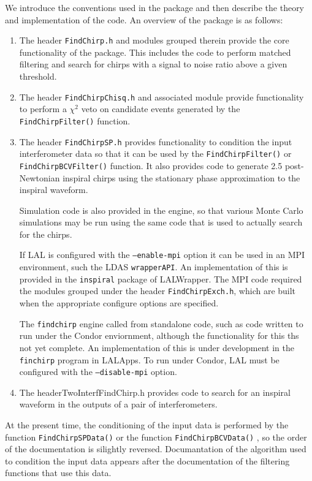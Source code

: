 We introduce the conventions used in the package and then describe the theory
and implementation of the code. An overview of the package is as follows:
\begin{enumerate}
\item The header \texttt{FindChirp.h} and modules grouped therein provide the
core functionality of the package. This includes the code to perform matched
filtering and search for chirps with a signal to noise ratio above a given
threshold.

\item The header \texttt{FindChirpChisq.h} and associated module provide
functionality to perform a $\chi^2$ veto on candidate events generated by the
\texttt{FindChirpFilter()} function.

\item The header \texttt{FindChirpSP.h} provides functionality to condition
the input interferometer data so that it can be used by the 
\texttt{FindChirpFilter()}
or \texttt{FindChirpBCVFilter()} function. 
It also provides code to generate 2.5
post-Newtonian inspiral chirps using the stationary phase approximation to the
inspiral waveform.

Simulation code is also provided in the engine, so that various Monte Carlo
simulations may be run using the same code that is used to actually search for
the chirps.

If LAL is configured with the \texttt{--enable-mpi} option it can
be used in an MPI environment, such the LDAS \texttt{wrapperAPI}. An
implementation of this is provided in the \texttt{inspiral} package of
LALWrapper. The MPI code required the modules grouped under the header
\texttt{FindChirpExch.h}, which are built when the appropriate configure
options are specified.

The \texttt{findchirp} engine called from standalone code, such as code
written to run under the Condor enviornment, although the functionality for
this ths not yet complete. An implementation of this is under development in
the \texttt{finchirp} program in LALApps. To run under Condor, LAL must be
configured with the \texttt{--disable-mpi} option.

\item The header{TwoInterfFindChirp.h} provides code to search for an inspiral
waveform in the outputs of a pair of interferometers.
\end{enumerate}

At the present time, the conditioning of the input data is performed by the
function \texttt{FindChirpSPData()} or the function \texttt{FindChirpBCVData()}
, so the order of the documentation is
silightly reversed. Documantation of the algorithm used to condition the input
data appears after the documentation of the filtering functions that use this
data.

